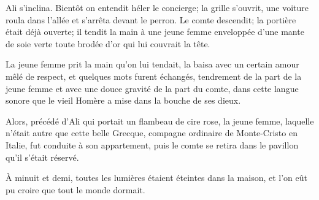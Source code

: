 Ali s'inclina. Bientôt on entendit héler le concierge; la grille s'ouvrit, une voiture roula dans l'allée et s'arrêta devant le perron. Le comte descendit; la portière était déjà ouverte; il tendit la main à une jeune femme enveloppée d'une mante de soie verte toute brodée d'or qui lui couvrait la tête. 

La jeune femme prit la main qu'on lui tendait, la baisa avec un certain amour mêlé de respect, et quelques mots furent échangés, tendrement de la part de la jeune femme et avec une douce gravité de la part du comte, dans cette langue sonore que le vieil Homère a mise dans la bouche de ses dieux. 

Alors, précédé d'Ali qui portait un flambeau de cire rose, la jeune femme, laquelle n'était autre que cette belle Grecque, compagne ordinaire de Monte-Cristo en Italie, fut conduite à son appartement, puis le comte se retira dans le pavillon qu'il s'était réservé.  

À minuit et demi, toutes les lumières étaient éteintes dans la maison, et l'on eût pu croire que tout le monde dormait. 